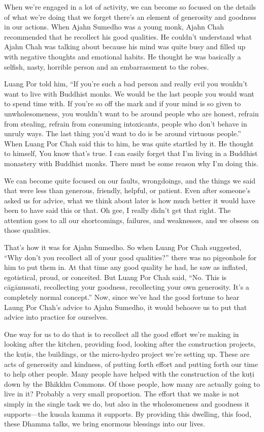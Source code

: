 
When we're engaged in a lot of activity, we can become so focused on 
the details of what we're doing that we forget there's an element of 
generosity and goodness in our actions. When Ajahn Sumedho was a young 
monk, Ajahn Chah recommended that he recollect his good qualities. He 
couldn't understand what Ajahn Chah was talking about because his mind 
was quite busy and filled up with negative thoughts and emotional 
habits. He thought he was basically a selfish, nasty, horrible person 
and an embarrassment to the robes.

Luang Por told him, ``If you're such a bad person and really evil you 
wouldn't want to live with Buddhist monks. We would be the last people 
you would want to spend time with. If you're so off the mark and if 
your mind is so given to unwholesomeness, you wouldn't want to be 
around people who are honest, refrain from stealing, refrain from 
consuming intoxicants, people who don't behave in unruly ways. The last 
thing you'd want to do is be around virtuous people.'' When Luang Por 
Chah said this to him, he was quite startled by it. He thought to 
himself, You know that's true. I can easily forget that I'm living in a 
Buddhist monastery with Buddhist monks. There must be some reason why 
I'm doing this.

We can become quite focused on our faults, wrongdoings, and the things 
we said that were less than generous, friendly, helpful, or patient. 
Even after someone's asked us for advice, what we think about later is 
how much better it would have been to have said this or that. Oh gee, I 
really didn't get that right. The attention goes to all our 
shortcomings, failures, and weaknesses, and we obsess on those 
qualities.

That's how it was for Ajahn Sumedho. So when Luang Por Chah suggested, 
``Why don't you recollect all of your good qualities?'' there was no 
pigeonhole for him to put them in. At that time any good quality he 
had, he saw as inflated, egotistical, proud, or conceited. But Luang 
Por Chah said, ``No. This is cāgānussati, recollecting your goodness, 
recollecting your own generosity. It's a completely normal concept.'' 
Now, since we've had the good fortune to hear Laung Por Chah's advice 
to Ajahn Sumedho, it would behoove us to put that advice into practice 
for ourselves.

One way for us to do that is to recollect all the good effort we're 
making in looking after the kitchen, providing food, looking after the 
construction projects, the kuṭis, the buildings, or the micro-hydro 
project we're setting up. These are acts of generosity and kindness, of 
putting forth effort and putting forth our time to help other people. 
Many people have helped with the construction of the kuṭi down by the 
Bhikkhu Commons. Of those people, how many are actually going to live 
in it? Probably a very small proportion. The effort that we make is not 
simply in the single task we do, but also in the wholesomeness and 
goodness it supports---the kusala kamma it supports. By providing this 
dwelling, this food, these Dhamma talks, we bring enormous blessings 
into our lives.

